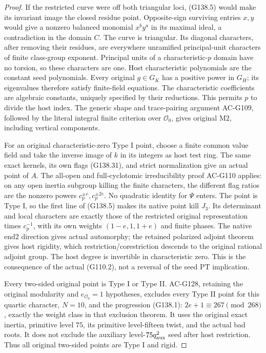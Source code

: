 \begin{proof}
If the restricted curve were off both triangular loci,
(G138.5) would make its invariant image the closed
residue point.  Opposite-sign surviving entries \(x,y\)
would give a nonzero balanced monomial \(x^b y^a\) in
its maximal ideal, a contradiction in the domain \(C\).
The curve is triangular.  Its diagonal characters,
after removing their residues, are everywhere unramified
principal-unit characters of finite class-group exponent.
Principal units of a characteristic-\(p\) domain have no
torsion, so these characters are one.  Host characteristic
polynomials are the constant seed polynomials.
Every original \(g\in G_K\) has a positive power in
\(G_H\); its eigenvalues therefore satisfy finite-field
equations.  The characteristic coefficients are algebraic
constants, uniquely specified by their reductions.
This permits \(p\) to divide the host index.
The generic shape and trace-pairing argument AC-G109,
followed by the literal integral finite criterion over
\(\mathcal O_0\), gives original \(\mathrm{M2}\), including
vertical components.

For an original characteristic-zero Type I point, choose
a finite common value field and take the inverse image
of \(k\) in its integers as host test ring.
The same exact kernels, its own flags (G138.31), and
strict normalization give an actual point of \(A\).
The all-open and full-cyclotomic irreducibility proof
AC-G110 applies: on any open inertia subgroup killing
the finite characters, the different flag ratios are
the nonzero powers \(c_p^{\pm e},c_p^{\pm2e}\).
No quadratic identity for \(\Psi\) enters.
The point is Type I, so the first line of (G138.5)
makes its native point kill \(J_3\).
Its determinant and local characters are exactly those
of the restricted original representation times
\(c_p^{-1}\), with its own weights
\((1-e,1,1+e)\) and finite phases.
The native \(\mathrm{end2}\) direction gives actual
automorphy; the retained polarized adjoint theorem
gives host rigidity, which restriction/corestriction
descends to the original rational adjoint group.
The host degree is invertible in characteristic zero.
This is the consequence of the actual (G110.2), not
a reversal of the seed \(\mathrm{PT}\) implication.

Every two-sided original point is Type I or Type II.
AC-G128, retaining the original modularity and
\(e_{\mathcal O_0}=1\) hypotheses, excludes every Type II
point for this quartic character, \(N=10\), and the
progression (G138.1): \(2e+1\equiv267\pmod{268}\), exactly
the weight class in that exclusion theorem.
It uses the original exact inertia, primitive level \(75\), its primitive
level-fifteen twist, and the actual bad roots.
It does not exclude the auxiliary level-\(75q_{\rm aux}^2\)
seed after host restriction.
Thus all original two-sided points are Type I and rigid.


\end{proof}

